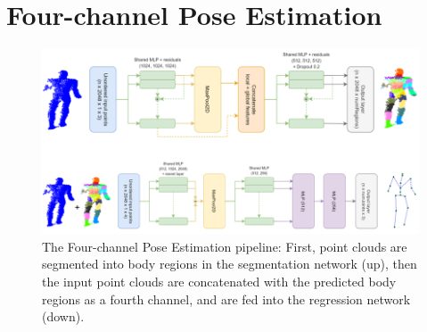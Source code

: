 
 \section{Four-channel Pose Estimation}

\vspace{5mm}
\begin{figure}[H]
\begin{center}
  \includegraphics[width=\textwidth]{images/implementation/4chan_pipeline.png}
  \caption[The Four-channel Pose Estimation pipeline.]{ The Four-channel Pose Estimation pipeline: First, point clouds are segmented into body regions in the segmentation network (up), then the input point clouds are concatenated with the predicted body regions as a fourth channel, and are fed into the regression network (down).}
  \label{fig:4chan_pipeline}
\end{center}
\end{figure}


